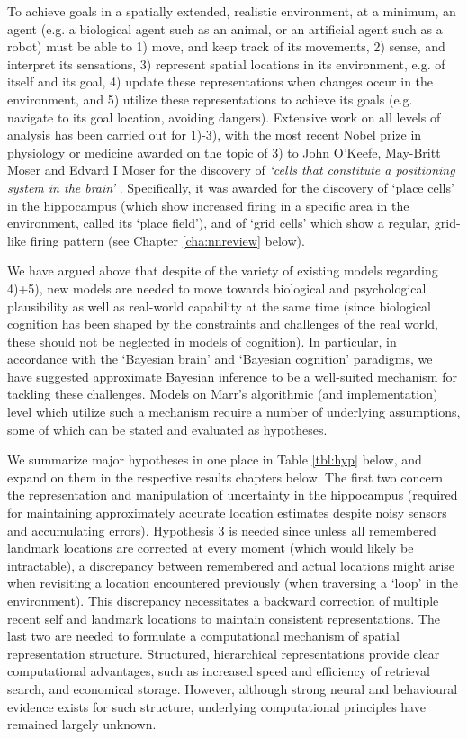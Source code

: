 To achieve goals in a spatially extended, realistic environment, at a minimum, an agent (e.g. a biological agent such as an animal, or an artificial agent such as a robot) must be able to 1) move, and keep track of its movements, 2) sense, and interpret its sensations, 3) represent spatial locations in its environment, e.g. of itself and its goal, 4) update these representations when changes occur in the environment, and 5) utilize these representations to achieve its goals (e.g. navigate to its goal location, avoiding dangers). Extensive work on all levels of analysis has been carried out for 1)-3), with the most recent Nobel prize in physiology or medicine awarded on the topic of 3) to John O'Keefe, May-Britt Moser and Edvard I Moser for the discovery of \textit{`cells that constitute a positioning system in the brain'} \citep{burgess2014nobel}. Specifically, it was awarded for the discovery of `place cells' in the hippocampus (which show increased firing in a specific area in the environment, called its `place field'), and of `grid cells' which show a regular, grid-like firing pattern (see Chapter \ref{cha:nnreview} below). 

We have argued above that despite of the variety of existing models regarding 4)+5), new models are needed to move towards biological and psychological plausibility as well as real-world capability at the same time (since biological cognition has been shaped by the constraints and challenges of the real world, these should not be neglected in models of cognition). In particular, in accordance with the `Bayesian brain' \citep{knill2004bayesian} and `Bayesian cognition' \citep{chater2010bayesian} paradigms, we have suggested approximate Bayesian inference to be a well-suited mechanism for tackling these challenges. Models on Marr's algorithmic (and implementation) level which utilize such a mechanism require a number of underlying assumptions, some of which can be stated and evaluated as hypotheses. 

We summarize major hypotheses in one place in Table \ref{tbl:hyp} below, and expand on them in the respective results chapters below. The first two concern the representation and manipulation of uncertainty in the hippocampus (required for maintaining approximately accurate location estimates despite noisy sensors and accumulating errors). Hypothesis 3 is needed since unless all remembered landmark locations are corrected at every moment (which would likely be intractable), a discrepancy between remembered and actual locations might arise when revisiting a location encountered previously (when traversing a `loop' in the environment). This discrepancy necessitates a backward correction of multiple recent self and landmark locations to maintain consistent representations. The last two are needed to formulate a computational mechanism of spatial representation structure. Structured, hierarchical representations provide clear computational advantages, such as increased speed and efficiency of retrieval search, and economical storage. However, although strong neural \citep{derdikman2010manifold} and behavioural \citep{hirtle1985evidence, mcnamara1989subjective, greenauer2010micro} evidence exists for such structure, underlying computational principles have remained largely unknown.

